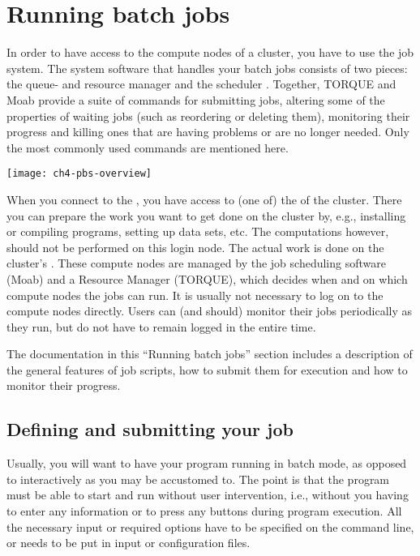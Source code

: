 \chapter{Running batch jobs}
\label{ch:running-batch-jobs}

In order to have access to the compute nodes of a cluster, you have to use
the job system. The system software that handles your batch jobs consists of
two pieces: the queue- and resource manager  and the scheduler
. Together, TORQUE and Moab provide a suite of commands for
submitting jobs, altering some of the properties of waiting jobs (such as
reordering or deleting them), monitoring their progress and killing ones that
are having problems or are no longer needed. Only the most commonly used
commands are mentioned here.

\begin{center}
\texttt{[image: ch4-pbs-overview]}
\end{center}

When you connect to the \hpc, you have access to (one of) the  of the cluster. There you can prepare the work you want to get done on
the cluster by, e.g., installing or compiling programs, setting up data sets,
etc. The computations however, should not be performed on this login node. The
actual work is done on the cluster's . These compute
nodes are managed by the job scheduling software (Moab) and a Resource Manager
(TORQUE), which decides when and on which compute nodes the jobs can run. It is
usually not necessary 
to log on to the
compute nodes directly. Users can (and should) monitor their jobs
periodically as they run, but do not have to remain logged in the entire
time.

The documentation in this ``Running batch jobs'' section includes a description
of the general features of job scripts, how to submit them for execution and
how to monitor their progress.

\section{Defining and submitting your job}

Usually, you will want to have your program running in batch mode, as opposed
to interactively as you may be accustomed to. The point is that the program
must be able to start and run without user intervention, i.e., without you
having to enter any information or to press any buttons during program
execution. All the necessary input or required options have to be specified on
the command line, or needs to be put in input or configuration files.

